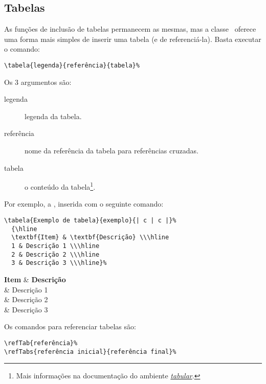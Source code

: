 %


\subsection{Tabelas}
As funções de inclusão de tabelas permanecem as mesmas, mas a classe \unbcic\
oferece uma forma mais simples de inserir uma tabela (e de referenciá-la). Basta
executar o comando:

\begin{verbatim}
\tabela{legenda}{referência}{tabela}%
\end{verbatim}

Os 3 argumentos são:
\begin{description}
\item[legenda] legenda da tabela.
\item[referência] nome da referência da tabela para referências cruzadas.
\item[tabela] o conteúdo da tabela\footnote{Mais informações na documentação do
ambiente \emph{\href{http://en.wikibooks.org/wiki/LaTeX/Tables}{tabular}}.}.
\end{description}

Por exemplo, a , inserida com o seguinte comando:
\begin{verbatim}
\tabela{Exemplo de tabela}{exemplo}{| c | c |}%
  {\hline
  \textbf{Item} & \textbf{Descrição} \\\hline
  1 & Descrição 1 \\\hline
  2 & Descrição 2 \\\hline
  3 & Descrição 3 \\\hline}%
\end{verbatim}

%
  {\hline
  \textbf{Item} & \textbf{Descrição} \\ & Descrição 1 \\ & Descrição 2 \\ & Descrição 3 \\\hline}%

Os comandos para referenciar tabelas são:

\begin{verbatim}
\refTab{referência}%
\refTabs{referência inicial}{referência final}%
\end{verbatim}


